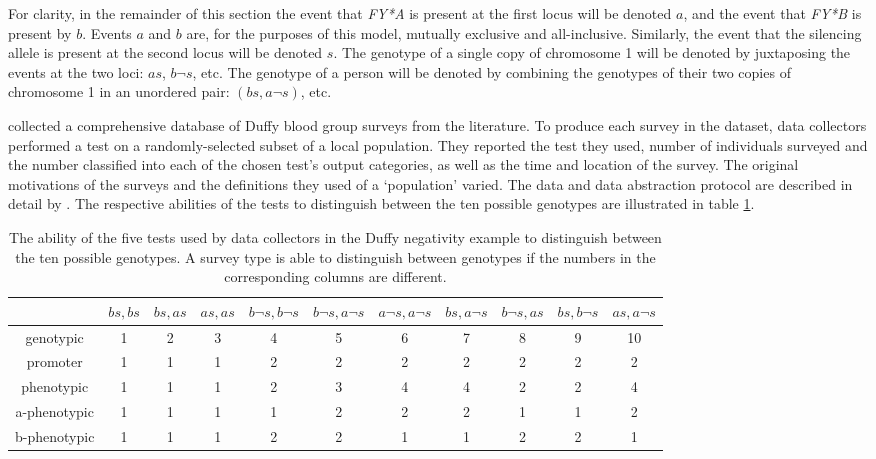 \documentclass[article]{jss}
\begin{document}
For clarity, in the remainder of this section the event that \emph{FY*A} is present at the first locus will be denoted $a$, and the event that \emph{FY*B} is present by $b$. Events $a$ and $b$ are, for the purposes of this model, mutually exclusive and all-inclusive. Similarly, the event that the silencing allele is present at the second locus will be denoted $s$. The genotype of a single copy of chromosome 1 will be denoted by juxtaposing the events at the two loci: $as$, $b\neg s$, etc. The genotype of a person will be denoted by combining the genotypes of their two copies of chromosome 1 in an unordered pair: $(bs,a \neg s)$, etc.

\cite{Howes} collected a comprehensive database of Duffy blood group surveys from the literature. To produce each survey in the dataset, data collectors performed a test on a randomly-selected subset of a local population. They reported the test they used, number of individuals surveyed and the number classified into each of the chosen test's output categories, as well as the time and location of the survey. The original motivations of the surveys and the definitions they used of a `population' varied. The data and data abstraction protocol are described in detail by \cite{Howes}. The respective abilities of the tests to distinguish between the ten possible genotypes are illustrated in table \ref{tab:surveys}.

\begin{table}
    \centering
    \begin{small}
        \begin{tabular}{ccccccccccc}
            &$bs,bs$&$bs,as$&$as,as$&$b\neg s,b\neg s$&$b\neg s,a\neg s$&$a\neg s,a\neg s$&$bs,a\neg s$&$b\neg s,as$&$bs,b\neg s$&$as,a\neg s$\\
            \hline\hline
            genotypic&1&2&3&4&5&6&7&8&9&10\\
            promoter&1&1&1&2&2&2&2&2&2&2\\
            phenotypic&1&1&1&2&3&4&4&2&2&4\\
            a-phenotypic&1&1&1&1&2&2&2&1&1&2\\
            b-phenotypic&1&1&1&2&2&1&1&2&2&1
            \label{tab:equiv-class}
        \end{tabular}            
    \end{small}
    \caption{The ability of the five tests used by data collectors in the Duffy negativity example to distinguish between the ten possible genotypes. A survey type is able to distinguish between genotypes if the numbers in the corresponding columns are different.}
    \label{tab:surveys}  
\end{table}
\end{document}
